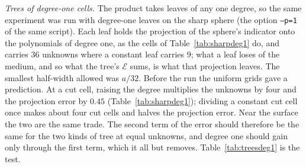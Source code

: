 \documentclass[11pt,a4paper]{article}
\newcommand{\cE}{\mathcal{E}}
\begin{document}
\emph{Trees of degree-one cells.} The product takes leaves of any one degree, so the same experiment
was run with degree-one leaves on the sharp sphere (the option \texttt{--p=1} of the same script). Each
leaf holds the projection of the sphere's indicator onto the polynomials of degree one, as the cells of
Table~\ref{tab:sharpdeg1} do, and carries $36$ unknowns where a constant leaf carries $9$; what a leaf
loses of the medium, and so what the tree's $\cE$ sums, is what that projection leaves. The smallest
half-width allowed was $a/32$. Before the run the uniform grids gave a prediction. At a cut cell,
raising the degree multiplies the unknowns by four and the projection error by $0.45$
(Table~\ref{tab:sharpdeg1}); dividing a constant cut cell once makes about four cut cells and halves the
projection error. Near the surface the two are the same trade. The second term of the error should
therefore be the same for the two kinds of tree at equal unknowns, and degree one should gain only
through the first term, which it all but removes. Table~\ref{tab:treesdeg1} is the test.
\end{document}
